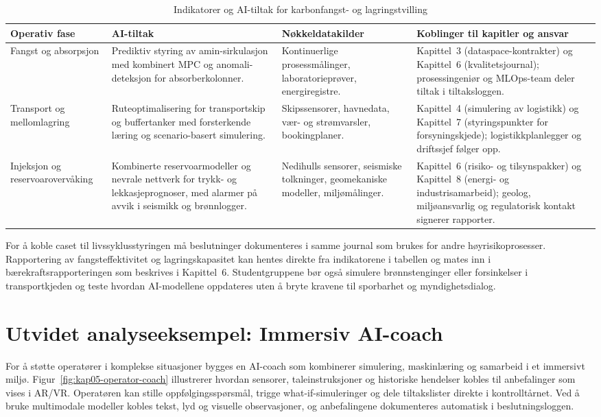 \begin{table}[htbp]
    \centering
    \caption{Indikatorer og AI-tiltak for karbonfangst- og lagringstvilling}
    \label{tab:kap05-ccs-indikatorer}
    \begin{tabular}{p{3.6cm}p{4.2cm}p{3.8cm}p{4.0cm}}
        \toprule
        \textbf{Operativ fase} & \textbf{AI-tiltak} & \textbf{Nøkkeldatakilder} & \textbf{Koblinger til kapitler og ansvar} \\
        \midrule
        Fangst og absorpsjon & Prediktiv styring av amin-sirkulasjon med kombinert MPC og anomali-deteksjon for absorberkolonner. & Kontinuerlige prosessmålinger, laboratorieprøver, energiregistre. & Kapittel~3 (dataspace-kontrakter) og Kapittel~6 (kvalitetsjournal); prosessingeniør og MLOps-team deler tiltak i tiltaksloggen. \\
        \addlinespace
        Transport og mellomlagring & Ruteoptimalisering for transportskip og buffertanker med forsterkende læring og scenario-basert simulering. & Skipssensorer, havnedata, vær- og strømvarsler, bookingplaner. & Kapittel~4 (simulering av logistikk) og Kapittel~7 (styringspunkter for forsyningskjede); logistikkplanlegger og driftssjef følger opp. \\
        \addlinespace
        Injeksjon og reservoarovervåking & Kombinerte reservoarmodeller og nevrale nettverk for trykk- og lekkasjeprognoser, med alarmer på avvik i seismikk og brønnlogger. & Nedihulls sensorer, seismiske tolkninger, geomekaniske modeller, miljømålinger. & Kapittel~6 (risiko- og tilsynspakker) og Kapittel~8 (energi- og industrisamarbeid); geolog, miljøansvarlig og regulatorisk kontakt signerer rapporter. \\
        \bottomrule
    \end{tabular}
\end{table}

For å koble caset til livssyklusstyringen må beslutninger dokumenteres i samme journal som brukes for andre høyrisikoprosesser. Rapportering av fangsteffektivitet og lagringskapasitet kan hentes direkte fra indikatorene i tabellen og mates inn i bærekraftsrapporteringen som beskrives i Kapittel~6. Studentgruppene bør også simulere brønnstenginger eller forsinkelser i transportkjeden og teste hvordan AI-modellene oppdateres uten å bryte kravene til sporbarhet og myndighetsdialog.

\section{Utvidet analyseeksempel: Immersiv AI-coach}
For å støtte operatører i komplekse situasjoner bygges en AI-coach som kombinerer simulering, maskinlæring og samarbeid i et immersivt miljø. Figur~\ref{fig:kap05-operator-coach} illustrerer hvordan sensorer, taleinstruksjoner og historiske hendelser kobles til anbefalinger som vises i AR/VR. Operatøren kan stille oppfølgingsspørsmål, trigge what-if-simuleringer og dele tiltakslister direkte i kontrolltårnet. Ved å bruke multimodale modeller kobles tekst, lyd og visuelle observasjoner, og anbefalingene dokumenteres automatisk i beslutningsloggen.

